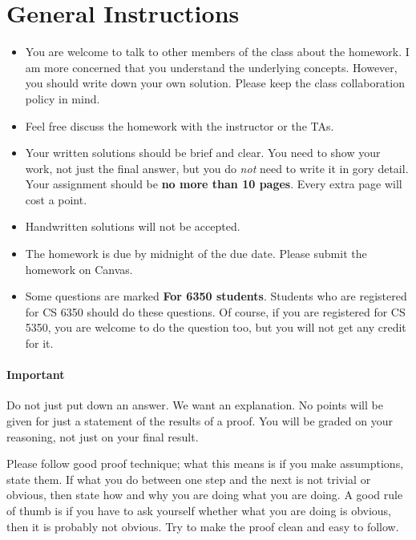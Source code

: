 \section*{General Instructions}

{\footnotesize
  \begin{itemize}
  \item You are welcome to talk to other members of the class about
    the homework. I am more concerned that you understand the
    underlying concepts. However, you should write down your own
    solution. Please keep the class collaboration policy in mind.

  \item Feel free discuss the homework with the instructor or the TAs.

  \item Your written solutions should be brief and clear. You need to
    show your work, not just the final answer, but you do \emph{not}
    need to write it in gory detail. Your assignment should be {\bf no
      more than 10 pages}. Every extra page will cost a point.

  \item Handwritten solutions will not be accepted.

  \item The homework is due by midnight of the due date. Please submit
    the homework on Canvas.

  \item Some questions are marked {\bf For 6350 students}. Students
    who are registered for CS 6350 should do these questions. Of
    course, if you are registered for CS 5350, you are welcome to do
    the question too, but you will not get any credit for it.

  \end{itemize}

  \paragraph{Important} Do not just put down an answer. We want an
  explanation. No points will be given for just a statement of the
  results of a proof. You will be graded on your reasoning, not just
  on your final result.

  Please follow good proof technique; what this means is if you make
  assumptions, state them. If what you do between one step and the
  next is not trivial or obvious, then state how and why you are
  doing what you are doing. A good rule of thumb is if you have to
  ask yourself whether what you are doing is obvious, then it is
  probably not obvious. Try to make the proof clean and easy to
  follow. 

}

